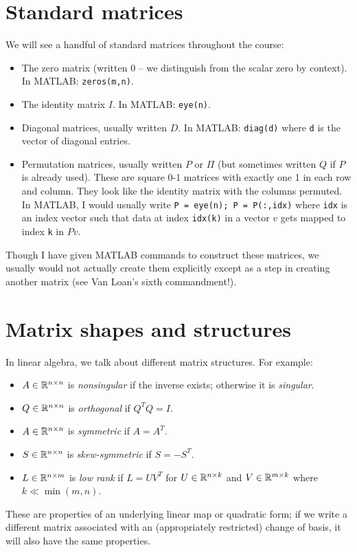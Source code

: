 \documentclass[12pt, leqno]{article}
\begin{document}
\section*{Standard matrices}

We will see a handful of standard matrices throughout the
course:
\begin{itemize}
\item The zero matrix (written $0$ -- we distinguish from the scalar
  zero by context).  In MATLAB: {\tt zeros(m,n)}.
\item The identity matrix $I$.  In MATLAB: {\tt eye(n)}.
\item Diagonal matrices, usually written $D$.  In MATLAB:
  {\tt diag(d)} where {\tt d} is the vector of diagonal entries.
\item Permutation matrices, usually written $P$ or $\Pi$ (but
  sometimes written $Q$ if $P$ is already used).  These are square 0-1
  matrices with exactly one 1 in each row and column.  They look like
  the identity matrix with the columns permuted.  In MATLAB, I would
  usually write {\tt P = eye(n); P = P(:,idx)} where {\tt idx} is an
  index vector such that data at index {\tt idx(k)} in a vector $v$
  gets mapped to index {\tt k} in $Pv$.
\end{itemize}
Though I have given MATLAB commands to construct these matrices,
we usually would not actually create them explicitly except as a
step in creating another matrix (see Van Loan's sixth commandment!).

\section{Matrix shapes and structures}

In linear algebra, we talk about different matrix structures.
For example:
\begin{itemize}
\item $A \in \mathbb{R}^{n \times n}$ is {\em nonsingular} if the inverse
  exists; otherwise it is {\em singular}.
\item $Q \in \mathbb{R}^{n \times n}$ is {\em orthogonal} if $Q^T Q = I$.
\item $A \in \mathbb{R}^{n \times n}$ is {\em symmetric} if $A = A^T$.
\item $S \in \mathbb{R}^{n \times n}$ is {\em skew-symmetric} if $S = -S^T$.
\item $L \in \mathbb{R}^{n \times m}$ is {\em low rank} if $L = UV^T$
  for $U \in \mathbb{R}^{n \times k}$ and $V \in \mathbb{R}^{m \times k}$ where
  $k \ll \min(m,n)$.
\end{itemize}
These are properties of an underlying linear map or quadratic form; if
we write a different matrix associated with an (appropriately
restricted) change of basis, it will also have the same properties.
\end{document}
